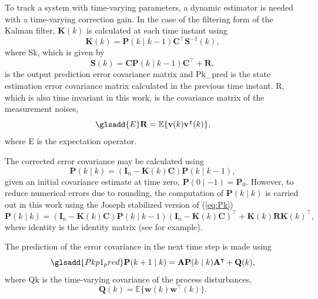 To track a system with time-varying parameters, a dynamic estimator is needed with a time-varying correction gain. In the case of the filtering form of the Kalman filter, $\mathbf{K}(k)$ is calculated at each time instant using
\begin{equation} \label{eq:Kk}
	\mathbf{K}(k) = \mathbf{P}(k \mid k-1)\mathbf{C}^\intercal \mathbf{S}^{-1}(k),
\end{equation}
where \gls{Sk}, which is given by
\begin{equation} \label{eq:Sk}
	\mathbf{S}(k) = \mathbf{C}\mathbf{P}(k \mid k-1)\mathbf{C}^\intercal + \mathbf{R},
\end{equation}
is the output prediction error covariance matrix and \gls{Pk_pred} is the state estimation error covariance matrix calculated in the previous time instant.  \gls{R}, which is also time invariant in this work, is the covariance matrix of the measurement noises,
\begin{equation} \label{eq:R} \glsadd{E}
	\mathbf{R} = \mathbb{E}\{ \mathbf{v}(k) \mathbf{v}^\intercal(k) \},
\end{equation}
where \gls{E} is the expectation operator.

The corrected error covariance may be calculated using
\begin{equation} \label{eq:Pk}
	\mathbf{P}(k \mid k) = \left( \mathbf{I}_n - \mathbf{K}(k) \mathbf{C} \right) \mathbf{P}(k \mid k-1),
\end{equation}
given an initial covariance estimate at time zero, $\mathbf{P}(0 \mid -1)=\mathbf{P}_0$. However, to reduce numerical errors due to rounding, the computation of $\mathbf{P}(k \mid k)$ is carried out in this work using the Joseph stabilized version of (\ref{eq:Pk})
 \begin{equation} \label{eq:Pk-stab}
 	\mathbf{P}(k \mid k) = \left( \mathbf{I}_n - \mathbf{K}(k) \mathbf{C} \right ) \mathbf{P}(k \mid k-1) \left( \mathbf{I}_n - \mathbf{K}(k) \mathbf{C} \right )^\intercal + \mathbf{K}(k)  \mathbf{R} \mathbf{K}(k)^\intercal,
 \end{equation}
where \gls{identity} is the identity matrix (see \cite{lewis_optimal_2008} for example).

The prediction of the error covariance in the next time step is made using
\begin{equation} \label{eq:Pkp1} \glsadd{Pkp1_pred}
	\mathbf{P}(k+1 \mid k) = \mathbf{A} \mathbf{P}(k \mid k)  \mathbf{A}^\intercal  + \mathbf{Q}(k),
\end{equation}
where \gls{Qk} is the time-varying covariance of the process disturbances,
\begin{equation} \label{eq:Q}
	\mathbf{Q}(k) = \mathbb{E}\{ \mathbf{w}(k) \mathbf{w}^\intercal(k) \}.
\end{equation}


